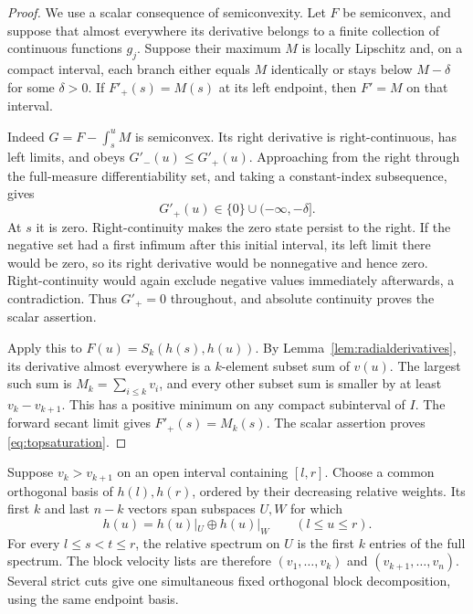 \begin{proof}
We use a scalar consequence of semiconvexity. Let $F$ be semiconvex,
and suppose that almost everywhere its derivative belongs to a
finite collection of continuous functions $g_j$. Suppose their
maximum $M$ is locally Lipschitz and, on a compact interval, each
branch either equals $M$ identically or stays below $M-\delta$
for some $\delta>0$. If $F'_+(s)=M(s)$ at its left endpoint,
then $F'=M$ on that interval.

Indeed $G=F-\int_s^uM$ is semiconvex. Its right derivative is
right-continuous, has left limits, and obeys
$G'_-(u)\le G'_+(u)$. Approaching from the right through the
full-measure differentiability set, and taking a constant-index
subsequence, gives
\[
 G'_+(u)\in\{0\}\cup(-\infty,-\delta].
\]
At $s$ it is zero. Right-continuity makes the zero state persist
to the right. If the negative set had a first infimum after this
initial interval, its left limit there would be zero, so its right
derivative would be nonnegative and hence zero. Right-continuity
would again exclude negative values immediately afterwards,
a contradiction. Thus $G'_+=0$ throughout, and absolute
continuity proves the scalar assertion.

Apply this to $F(u)=S_k(h(s),h(u))$. By
Lemma~\ref{lem:radialderivatives}, its derivative almost everywhere
is a $k$-element subset sum of $v(u)$. The largest such sum is
$M_k=\sum_{i\le k}v_i$, and every other subset sum is smaller by
at least $v_k-v_{k+1}$. This has a positive minimum on any compact
subinterval of $I$. The forward secant limit gives
$F'_+(s)=M_k(s)$. The scalar assertion proves
\eqref{eq:topsaturation}.
\end{proof}

\begin{proposition}\label{prop:fixedgapsubspaces}
Suppose $v_k>v_{k+1}$ on an open interval containing $[l,r]$.
Choose a common orthogonal basis of $h(l),h(r)$, ordered by their
decreasing relative weights. Its first $k$ and last $n-k$ vectors
span subspaces $U,W$ for which
\begin{equation}\label{eq:fixedgapdecomposition}
 h(u)=h(u)|_U\oplus h(u)|_W\qquad(l\le u\le r).
\end{equation}
For every $l\le s<t\le r$, the relative spectrum on $U$ is the
first $k$ entries of the full spectrum. The block velocity lists
are therefore $(v_1,\ldots,v_k)$ and $(v_{k+1},\ldots,v_n)$.
Several strict cuts give one simultaneous fixed orthogonal block
decomposition, using the same endpoint basis.
\end{proposition}

